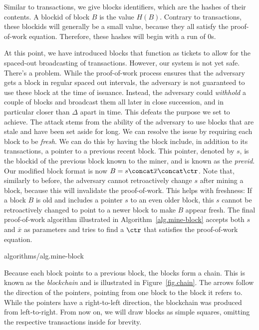 Similar to transactions, we give blocks identifiers, which are the hashes of their contents.
A blockid of block $B$ is the value $H(B)$. Contrary to transactions, these blockids will
generally be a small value, because they all satisfy the proof-of-work equation. Therefore,
these hashes will begin with a run of $0$s.

At this point, we have introduced blocks that function as tickets to allow for the spaced-out
broadcasting of transactions. However, our system is not yet safe. There's a problem. While
the proof-of-work process ensures that the adversary gets a block in regular spaced out
intervals, the adversary is not guaranteed to use these block at the time of issuance.
Instead, the adversary could \emph{withhold} a couple of blocks and broadcast them all later
in close succession, and in particular closer than $\Delta$ apart in time. This defeats the
purpose we set to achieve. The attack stems from the ability of the adversary to use blocks
that are stale and have been set aside for long. We can resolve the issue by requiring
each block to be \emph{fresh}. We can do this by having the block include, in addition to
its transactions, a pointer to a previous recent block. This pointer, denoted by $s$,
is the blockid of the previous block known to the miner, and is known as the \emph{previd}.
Our modified block format is now $B = s \concat \overline{x} \concat \ctr$. Note that,
similarly to before, the adversary cannot retroactively change $s$ after mining a block,
because this will invalidate the proof-of-work. This helps with freshness: If a block $B$ is
old and includes a pointer $s$ to an even older block, this $s$ cannot be retroactively
changed to point to a newer block to make $B$ appear fresh. The final proof-of-work algorithm
illustrated in Algorithm~\ref{alg.mine-block}
accepts both $s$ and $\overline{x}$ as parameters and tries to find a $\ctr$ that
satisfies the proof-of-work equation.

{algorithms/alg.mine-block}

Because each block points to a previous block, the blocks form a chain. This is known
as the \emph{blockchain} and is illustrated in Figure~\ref{fig.chain}.
The arrows follow the direction of the pointers, pointing from one block to the block
it refers to. While the pointers have a right-to-left direction, the blockchain was
produced from left-to-right. From now on, we will draw blocks as simple squares,
omitting the respective transactions inside for brevity.

